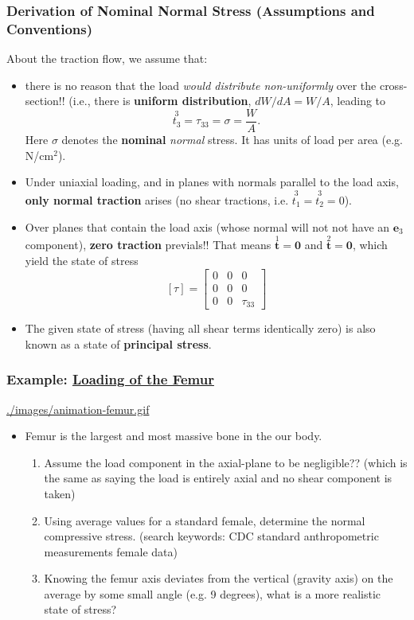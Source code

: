 \documentclass[11pt]{article}
\begin{document}
\subsubsection*{Derivation of Nominal Normal Stress (Assumptions and Conventions)}
\label{sec:org948b05d}
About the traction flow, we assume that:
\begin{itemize}
\item there is no reason that the load \emph{would distribute non-uniformly} over the cross-section!! (i.e., there is \textbf{uniform distribution}, \(dW/dA = W/A\), leading to
$$ \overset{3}{t_3} = \tau_{33} = \sigma = \frac{W}{A}. $$
Here \(\sigma\) denotes the \textbf{nominal} \emph{normal} stress. It has units of load per area (e.g. N/cm\(^2\)).
\end{itemize}
\begin{itemize}
\item Under uniaxial loading, and in planes with normals parallel to the load axis, \textbf{only normal traction} arises (no shear tractions, i.e. \(\overset{3}{t_1} = \overset{3}{t_2} = 0\)).
\item Over planes that contain the load axis (whose normal will not not have an \(\boldsymbol{e}_3\) component), \textbf{zero traction} previals!! That means \(\overset{1}{\boldsymbol{t}}=\mathbf{0}\) and \(\overset{2}{\boldsymbol{t}}=\mathbf{0}\), which yield the state of stress
$$ [\tau] = \begin{bmatrix} 0 & 0 & 0 \\ 0 & 0 & 0 \\ 0 & 0 & \tau_{33} \end{bmatrix} $$
\item The given state of stress (having all shear terms identically zero) is also known as a state of \textbf{principal stress}.
\end{itemize}
\subsubsection*{Example: \href{https://openoregon.pressbooks.pub/bodyphysics2ed/chapter/stress-and-strain-on-the-body/}{Loading of the Femur}}
\label{sec:orgfa09e8c}
\url{./images/animation-femur.gif}

\begin{itemize}
\item Femur is the largest and most massive bone in the our body.
\begin{enumerate}
\item Assume the load component in the axial-plane to be negligible?? (which is the same as saying the load is entirely axial and no shear component is taken)
\item Using average values for a standard female, determine the normal compressive stress. (search keywords: CDC standard anthropometric measurements female data)
\item Knowing the femur axis deviates from the vertical (gravity axis) on the average by some small angle (e.g. 9 degrees), what is a more realistic state of stress?
\end{enumerate}
\end{itemize}
\end{document}
